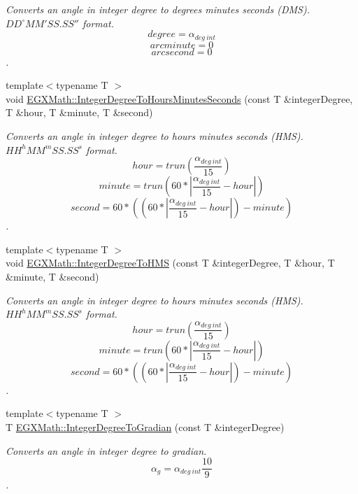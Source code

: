\begin{DoxyCompactItemize}
\begin{DoxyCompactList}\small\item\em Converts an angle in integer degree to degrees minutes seconds (D\+MS). ${DD}^{\circ}{MM}'{SS.SS}''$ format. \[degree=\alpha_{deg\ int}\] \[arcminute= 0\] \[arcsecond= 0\]. \end{DoxyCompactList}\item 
{\footnotesize template$<$typename T $>$ }\\void \mbox{\hyperlink{group___e_g_x_math-_angle_conversions-_integer_degree_gaaac96728b305fd8ed024843f4e92fd08}{E\+G\+X\+Math\+::\+Integer\+Degree\+To\+Hours\+Minutes\+Seconds}} (const T \&integer\+Degree, T \&hour, T \&minute, T \&second)
\begin{DoxyCompactList}\small\item\em Converts an angle in integer degree to hours minutes seconds (H\+MS). ${HH}^{h}{MM}^{m}{SS.SS}^{s}$ format. \[hour=trun(\frac{\alpha_{deg\ int}}{15})\] \[minute=trun(60 * |\frac{\alpha_{deg\ int}}{15} - hour|)\] \[second=60 * ((60 * |\frac{\alpha_{deg\ int}}{15} - hour|)-minute)\]. \end{DoxyCompactList}\item 
{\footnotesize template$<$typename T $>$ }\\void \mbox{\hyperlink{group___e_g_x_math-_angle_conversions-_integer_degree_gae6b79bd5a92f8c6942b9fc2c50695e6a}{E\+G\+X\+Math\+::\+Integer\+Degree\+To\+H\+MS}} (const T \&integer\+Degree, T \&hour, T \&minute, T \&second)
\begin{DoxyCompactList}\small\item\em Converts an angle in integer degree to hours minutes seconds (H\+MS). ${HH}^{h}{MM}^{m}{SS.SS}^{s}$ format. \[hour=trun(\frac{\alpha_{deg\ int}}{15})\] \[minute=trun(60 * |\frac{\alpha_{deg\ int}}{15} - hour|)\] \[second=60 * ((60 * |\frac{\alpha_{deg\ int}}{15} - hour|)-minute)\]. \end{DoxyCompactList}\item 
{\footnotesize template$<$typename T $>$ }\\T \mbox{\hyperlink{group___e_g_x_math-_angle_conversions-_integer_degree_ga47127467ff7a8ef57f6be9ce496a97df}{E\+G\+X\+Math\+::\+Integer\+Degree\+To\+Gradian}} (const T \&integer\+Degree)
\begin{DoxyCompactList}\small\item\em Converts an angle in integer degree to gradian. \[\alpha_{g}=\alpha_{deg\ int}\frac{10}{9}\]. \end{DoxyCompactList}\item 

\end{DoxyCompactItemize}
